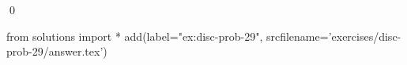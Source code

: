
\begin{ex} 
  \label{ex:disc-prob-29}
  
  \qed
\end{ex} 
\begin{python0}
from solutions import *
add(label="ex:disc-prob-29",
    srcfilename='exercises/disc-prob-29/answer.tex') 
\end{python0}
